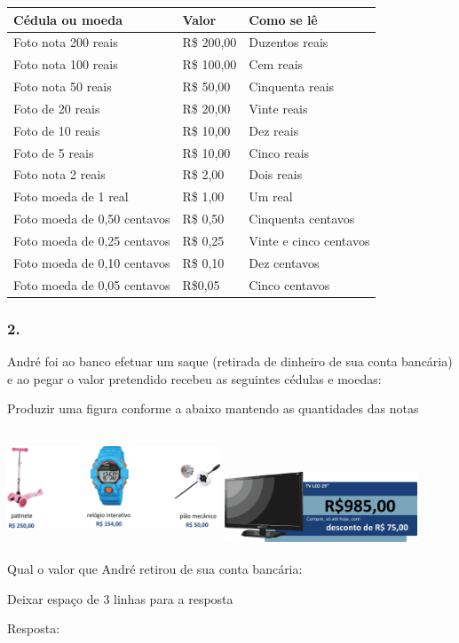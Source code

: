 \begin{longtable}[]{@{}lll@{}}
\toprule
Cédula ou moeda & Valor & Como se lê\tabularnewline
\midrule
\endhead
Foto nota 200 reais & R\$ 200,00 & Duzentos reais\tabularnewline
Foto nota 100 reais & R\$ 100,00 & Cem reais\tabularnewline
Foto nota 50 reais & R\$ 50,00 & Cinquenta reais\tabularnewline
Foto de 20 reais & R\$ 20,00 & Vinte reais\tabularnewline
Foto de 10 reais & R\$ 10,00 & Dez reais\tabularnewline
Foto de 5 reais & R\$ 10,00 & Cinco reais\tabularnewline
Foto nota 2 reais & R\$ 2,00 & Dois reais\tabularnewline
Foto moeda de 1 real & R\$ 1,00 & Um real\tabularnewline
Foto moeda de 0,50 centavos & R\$ 0,50 & Cinquenta
centavos\tabularnewline
Foto moeda de 0,25 centavos & R\$ 0,25 & Vinte e cinco
centavos\tabularnewline
Foto moeda de 0,10 centavos & R\$ 0,10 & Dez centavos\tabularnewline
Foto moeda de 0,05 centavos & R\$0,05 & Cinco centavos\tabularnewline
\bottomrule
\end{longtable}

\subsubsection{2.}\label{section-81}

André foi ao banco efetuar um saque (retirada de dinheiro de sua conta
bancária) e ao pegar o valor pretendido recebeu as seguintes cédulas e
moedas:

Produzir uma figura conforme a abaixo mantendo as quantidades das notas

\includegraphics[width=2.50022in,height=1.34178in]{media/image72.png}
\includegraphics[width=2.26686in,height=0.87508in]{media/image73.png}

Qual o valor que André retirou de sua conta bancária:

Deixar espaço de 3 linhas para a resposta

Resposta:

